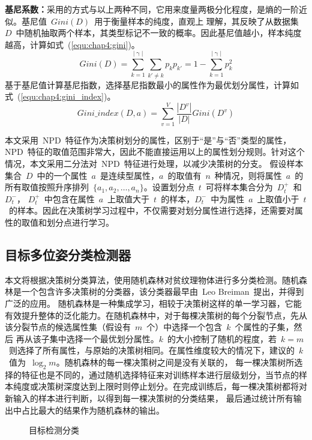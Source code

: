 \noindent\textbf{基尼系数：}采用的方式与以上两种不同，它用来度量两极分化程度，是熵的一阶近似。基尼值~$Gini(D)$~用于衡量样本的纯度，直观上
理解，其反映了从数据集~$D$~中随机抽取两个样本，其类型标记不一致的概率。因此基尼值越小，样本纯度越高，计算如式~(\ref{equ:chap4:gini})。
\begin{equation}
  \label{equ:chap4:gini}
  Gini(D)=\sum_{k=1}^{|\upgamma |}\sum_{k'\neq k}p_k p_{k'}=1-\sum_{k=1}^{|\upgamma|}p_k^2
\end{equation}
基于基尼值计算基尼指数，选择基尼指数最小的属性作为最优划分属性，计算如式~(\ref{equ:chap4:gini_index})。
\begin{equation}
  \label{equ:chap4:gini_index}
  Gini\_index(D,a)=\sum_{v=1}^{V}\frac{|D^v|}{|D|}Gini(D^v)
\end{equation}

本文采用~NPD~特征作为决策树划分的属性，区别于“是”与“否”类型的属性，NPD~特征的取值范围非常大，因此不能直接运用以上的属性划分规则。针对这个情况，本文采用二分法对~NPD~特征进行处理，以减少决策树的分支。
假设样本集合~$D$~中的一个属性~$a$~是连续型属性，$a$~的取值有~$n$~种情况，则将属性~$a$~的所有取值按照升序排列~$\{a_1,a_2,\dotsc,a_n\}$。设置划分点~$t$~可将样本集合分为~$D_t^+$~和~$D_t^-$，
$D_t^+$~中包含在属性~$a$~上取值大于~$t$~的样本，$D_t^-$~中为属性~$a$~上取值小于~$t$~的样本。因此在决策树学习过程中，不仅需要对划分属性进行选择，还需要对属性的取值和划分点进行学习。

\subsection{目标多位姿分类检测器}
\label{sec:object_detector}
本文将根据决策树分类算法，使用随机森林对贫纹理物体进行多分类检测。随机森林是一个包含许多决策树的分类器，该分类器最早由~Leo Breiman\cite{BreimanRandomForests2001}~提出，并得到广泛的应用。
随机森林是一种集成学习，相较于决策树这样的单一学习器，它能有效提升整体的泛化能力。在随机森林中，对于每棵决策树的每个分裂节点，先从该分裂节点的候选属性集（假设有~$m$~个）中选择一个包含~$k$~个属性的子集，然后
再从该子集中选择一个最优划分属性。$k$~的大小控制了随机的程度，若~$k=m$~则选择了所有属性，与原始的决策树相同。在属性维度较大的情况下，建议的~$k$~值为~$\log_2 m$。随机森林的每一棵决策树之间是没有关联的，
每一棵决策树所选择的特征也是不同的，通过随机选择特征来对训练样本进行层级划分，当节点的样本纯度或决策树深度达到上限时则停止划分。在完成训练后，每一棵决策树都将对新输入的样本进行判断，以得到每一棵决策树的分类结果，
最后通过统计所有输出中占比最大的结果作为随机森林的输出。
\begin{figure}[b] %
  \centering%
  \vskip0.2cm
  \quad
  \caption{目标检测分类}
  \label{fig:chap04:rf_obj_det_pose}
\end{figure}

